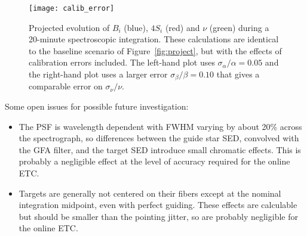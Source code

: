 \documentclass[11pt]{article}
\providecommand{\fig}[1]{Figure~\ref{fig:#1}}
\begin{document}
\begin{figure}[htb]
\begin{center}
\texttt{[image: calib\_error]}
\caption{Projected evolution of $B_i$ (blue), $4 S_i$ (red) and $\nu$ (green) during a 20-minute spectroscopic integration. These calculations are identical to the baseline scenario of \fig{project}, but with the effects of calibration errors included.  The left-hand plot uses $\sigma_\alpha/\alpha = 0.05$ and the right-hand plot uses a larger error $\sigma_\beta/\beta = 0.10$ that gives a comparable error on $\sigma_\nu/\nu$.}
\label{fig:calib_error}
\end{center}
\end{figure}

Some open issues for possible future investigation:
\begin{itemize}
\item The PSF is wavelength dependent with FWHM varying by about 20\% across the spectrograph, so differences between the guide star SED, convolved with the GFA filter, and the target SED introduce small chromatic effects. This is probably a negligible effect at the level of accuracy required for the online ETC.
\item Targets are generally not centered on their fibers except at the nominal integration midpoint, even with perfect guiding. These effects are calculable but should be smaller than the pointing jitter, so are probably negligible for the online ETC.
\end{itemize}
\end{document}
